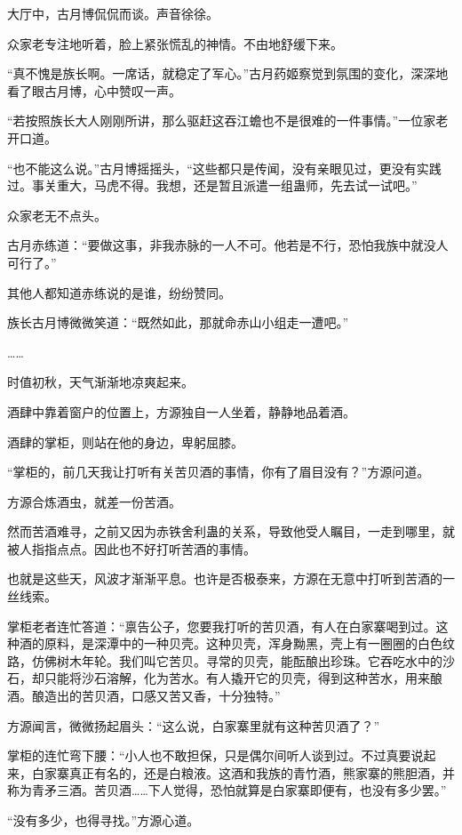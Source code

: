 \begin{this_body}
大厅中，古月博侃侃而谈。声音徐徐。

众家老专注地听着，脸上紧张慌乱的神情。不由地舒缓下来。

“真不愧是族长啊。一席话，就稳定了军心。”古月药姬察觉到氛围的变化，深深地看了眼古月博，心中赞叹一声。

“若按照族长大人刚刚所讲，那么驱赶这吞江蟾也不是很难的一件事情。”一位家老开口道。

“也不能这么说。”古月博摇摇头，“这些都只是传闻，没有亲眼见过，更没有实践过。事关重大，马虎不得。我想，还是暂且派遣一组蛊师，先去试一试吧。”

众家老无不点头。

古月赤练道：“要做这事，非我赤脉的一人不可。他若是不行，恐怕我族中就没人可行了。”

其他人都知道赤练说的是谁，纷纷赞同。

族长古月博微微笑道：“既然如此，那就命赤山小组走一遭吧。”

……

时值初秋，天气渐渐地凉爽起来。

酒肆中靠着窗户的位置上，方源独自一人坐着，静静地品着酒。

酒肆的掌柜，则站在他的身边，卑躬屈膝。

“掌柜的，前几天我让打听有关苦贝酒的事情，你有了眉目没有？”方源问道。

方源合炼酒虫，就差一份苦酒。

然而苦酒难寻，之前又因为赤铁舍利蛊的关系，导致他受人瞩目，一走到哪里，就被人指指点点。因此也不好打听苦酒的事情。

也就是这些天，风波才渐渐平息。也许是否极泰来，方源在无意中打听到苦酒的一丝线索。

掌柜老者连忙答道：“禀告公子，您要我打听的苦贝酒，有人在白家寨喝到过。这种酒的原料，是深潭中的一种贝壳。这种贝壳，浑身黝黑，壳上有一圈圈的白色纹路，仿佛树木年轮。我们叫它苦贝。寻常的贝壳，能酝酿出珍珠。它吞吃水中的沙石，却只能将沙石溶解，化为苦水。有人撬开它的贝壳，得到这种苦水，用来酿酒。酿造出的苦贝酒，口感又苦又香，十分独特。”

方源闻言，微微扬起眉头：“这么说，白家寨里就有这种苦贝酒了？”

掌柜的连忙弯下腰：“小人也不敢担保，只是偶尔间听人谈到过。不过真要说起来，白家寨真正有名的，还是白粮液。这酒和我族的青竹酒，熊家寨的熊胆酒，并称为青矛三酒。苦贝酒……下人觉得，恐怕就算是白家寨即便有，也没有多少罢。”

“没有多少，也得寻找。”方源心道。


\end{this_body}
